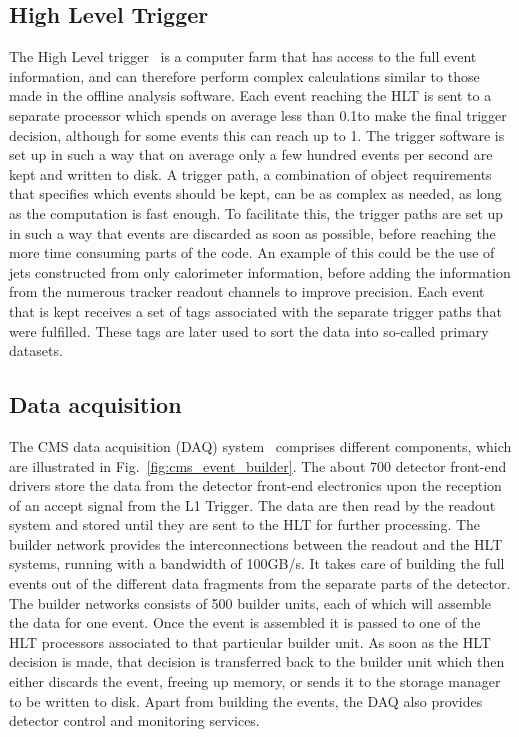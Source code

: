 \subsection{High Level Trigger \label{sec:cms_hlt}}

The High Level trigger~\cite{Adam:2005zf} is a computer farm that has access to the full event
information, and can therefore perform complex calculations similar to those made in the offline
analysis software. 
Each event reaching the HLT is sent to a separate processor which spends on average less than
0.1\second to make the final trigger decision, although for some events this can reach up to
1\second. 
The trigger software is set up in such a way that on average only a few hundred events per second
are kept and written to disk. 
A trigger path, a combination of object requirements that specifies which events should
be kept, can be as complex as needed, as long as the computation is fast enough. 
To facilitate this, the trigger paths are set up in such a way that events are discarded as soon as
possible, before reaching the more time consuming parts of the code. 
An example of this could be the use of jets constructed from only calorimeter information, before
adding the information from the numerous tracker readout channels to improve precision. 
Each event that is kept receives a set of tags associated with the separate trigger paths that were
fulfilled. These tags are later used to sort the data into so-called primary datasets. 



\subsection{Data acquisition \label{sec:cms_daq}}

The CMS data acquisition (DAQ) system~\cite{Cittolin:578006} comprises different components, which
are illustrated in Fig.~\ref{fig:cms_event_builder}. 
The about 700 detector front-end drivers store the data from the detector front-end electronics upon
the reception of an accept signal from the L1 Trigger. The data are then read by the readout system
and stored until they are sent to the HLT for further processing. 
The builder network provides the interconnections between the readout and the HLT systems, running
with a bandwidth of 100\unit{GB/s}. It takes care of building the full events out of the different
data fragments from the separate parts of the detector. The builder networks consists of 500 builder
units, each of which will assemble the data for one event. 
Once the event is assembled it is passed to one of the HLT processors associated to that particular
builder unit. As soon as the HLT decision is made, that decision is transferred back to the builder
unit which then either discards the event, freeing up memory, or sends it to the storage
manager to be written to disk.
Apart from building the events, the DAQ also provides detector control and monitoring services.

